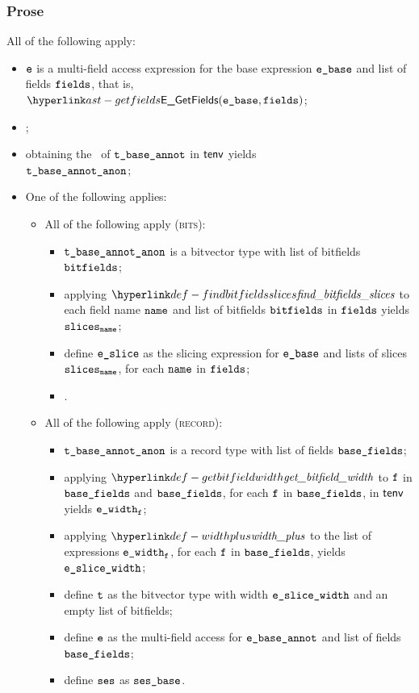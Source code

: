\subsubsection{Prose}
All of the following apply:
\begin{itemize}
  \item $\texttt{e}$ is a multi-field access expression for the base expression $\ebase$ and list of fields $\texttt{fields}$,
        that is, $\EGetFields(\ebase, \vfields)$;
  \item \Proseannotateexpr{$\tenv$}{$\ebase$}{\\ $(\tbaseannot, \vetwo, \vsesbase)$}\ProseOrTypeError;
  \item obtaining the \underlyingtype\ of $\texttt{t\_base\_annot}$ in $\tenv$ yields \\
        $\texttt{t\_base\_annot\_anon}$\ProseOrTypeError;
  \item One of the following applies:
  \begin{itemize}
    \item All of the following apply (\textsc{bits}):
    \begin{itemize}
      \item $\texttt{t\_base\_annot\_anon}$ is a bitvector type with list of bitfields $\texttt{bitfields}$\ProseOrTypeError;
      \item applying $\findbitfieldsslices$ to each field name $\texttt{name}$ and list of bitfields $\texttt{bitfields}$ in $\texttt{fields}$ yields \\
            $\texttt{slices}_{\texttt{name}}$\ProseOrTypeError;
      \item define $\veslice$ as the slicing expression for $\ebase$ and lists of slices $\texttt{slices}_{\texttt{name}}$, for each $\texttt{name}$ in $\texttt{fields}$;
      \item \Proseannotateexpr{$\tenv$}{$\veslice$}{\\ $(\vt, \newe, \vses)$}\ProseOrTypeError.
    \end{itemize}

    \item All of the following apply (\textsc{record}):
    \begin{itemize}
      \item $\texttt{t\_base\_annot\_anon}$ is a record type with list of fields $\texttt{base\_fields}$\ProseOrTypeError;
      \item applying $\getbitfieldwidth$ to $\texttt{f}$ in $\texttt{base\_fields}$ and $\texttt{base\_fields}$, for each $\texttt{f}$ in $\texttt{base\_fields}$, in $\tenv$ yields $\texttt{e\_width}_{\texttt{f}}$\ProseOrTypeError;
      \item applying $\widthplus$ to the list of expressions $\texttt{e\_width}_{\texttt{f}}$,
            for each $\texttt{f}$ in $\texttt{base\_fields}$, yields $\texttt{e\_slice\_width}$\ProseOrTypeError;
      \item define $\texttt{t}$ as the bitvector type with width $\texttt{e\_slice\_width}$ and an empty list of bitfields;
      \item define $\texttt{e}$ as the multi-field access for $\texttt{e\_base\_annot}$ and list of fields \\
            $\texttt{base\_fields}$;
      \item define $\texttt{ses}$ as $\texttt{ses\_base}$.
    \end{itemize}


\end{itemize}
\end{itemize}
